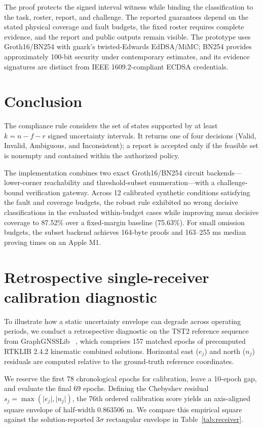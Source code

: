 \documentclass[pdflatex,iicol,sn-mathphys-num]{sn-jnl}
\theoremstyle{thmstyleone}
\begin{document}
The proof protects the signed interval witness while binding the classification to the task, roster, report, and challenge. The reported guarantees depend on the stated physical coverage and fault budgets, the fixed roster requires complete evidence, and the report and public outputs remain visible. The prototype uses Groth16/BN254 with gnark's twisted-Edwards EdDSA/MiMC; BN254 provides approximately 100-bit security under contemporary estimates, and its evidence signatures are distinct from IEEE 1609.2-compliant ECDSA credentials.

\section{Conclusion}
The compliance rule considers the set of states supported by at least $k = n - f - r$ signed uncertainty intervals. It returns one of four decisions (Valid, Invalid, Ambiguous, and Inconsistent); a report is accepted only if the feasible set is nonempty and contained within the authorized policy.

The implementation combines two exact Groth16/BN254 circuit backends---lower-corner reachability and threshold-subset enumeration---with a challenge-bound verification gateway. Across 12 calibrated synthetic conditions satisfying the fault and coverage budgets, the robust rule exhibited no wrong decisive classifications in the evaluated within-budget cases while improving mean decisive coverage to 87.52\% over a fixed-margin baseline (75.63\%). For small omission budgets, the subset backend achieves 164-byte proofs and 163--255 ms median proving times on an Apple M1.

\appendix
\section{Retrospective single-receiver calibration diagnostic}\label{app:receiver}
To illustrate how a static uncertainty envelope can degrade across operating periods, we conduct a retrospective diagnostic on the TST2 reference sequence from GraphGNSSLib ~\citep{GraphGNSSData}, which comprises 157 matched epochs of precomputed RTKLIB 2.4.2 kinematic combined solutions. Horizontal east ($e_j$) and north ($n_j$) residuals are computed relative to the ground-truth reference coordinates.

We reserve the first 78 chronological epochs for calibration, leave a 10-epoch gap, and evaluate the final 69 epochs. Defining the Chebyshev residual $s_j = \max(\vert{}e_j\vert{}, \vert{}n_j\vert{})$, the 76th ordered calibration score yields an axis-aligned square envelope of half-width $0.863506\text{ m}$. We compare this empirical square against the solution-reported $3\sigma$ rectangular envelope in Table~\ref{tab:receiver}.
\end{document}
